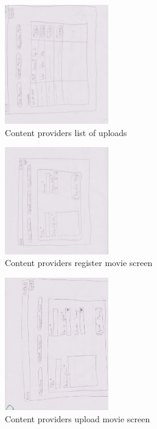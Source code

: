 \begin{figure}[!ht]
  \centering
    \includegraphics[angle=90, width=0.4\textwidth]{Parts/Appendix/Images/PaperMockup/CPMovieList}
  \caption{Content providers list of uploads}
  \label{fig:Appendix_GUI_sketches_ListofUploads}
\end{figure}
\begin{figure}[!ht]
  \centering
    \includegraphics[angle=90, width=0.4\textwidth]{Parts/Appendix/Images/PaperMockup/CPRegisterMovie}
  \caption{Content providers register movie screen}
  \label{fig:Appendix_GUI_sketches_CPRegister}
\end{figure}
\begin{figure}[!ht]
  \centering
    \includegraphics[angle=90, width=0.4\textwidth]{Parts/Appendix/Images/PaperMockup/CPUploadmovie}
  \caption{Content providers upload movie screen}
  \label{fig:Appendix_GUI_sketches_CPUploadMovie}
\end{figure}

